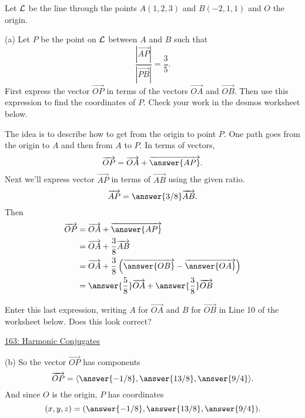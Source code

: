 \documentclass{ximera}
\begin{document}
\begin{question} \label{Q98344422}
Let ${\cal L}$ be the line through the points $A(1,2,3)$ and $B(-2,1,1)$ and $O$ the origin.

(a) Let $P$ be the point on ${\cal L}$ between $A$ and $B$ such that
\[
      \frac{|\overrightarrow{AP}|}{|\overrightarrow{PB}|} = \frac{3}{5} . 
\]
First express the vector $\overrightarrow{OP}$ in terms of the vectors $\overrightarrow{OA}$ and $\overrightarrow{OB}$. Then use this expression to find the coordinates of $P$. Check your work in the desmos worksheet below.

\begin{explanation}
The idea is to describe how to get from the origin to point $P$. One path goes from the origin to $A$ and then from $A$ to $P$. In terms of vectors,
\[
   \overrightarrow{OP} = \overrightarrow{OA} + \overrightarrow{\answer{AP}}.
\]
Next we'll express vector $\overrightarrow{AP}$ in terms of $\overrightarrow{AB}$ using the given ratio.
\[
      \overrightarrow{AP} = \answer{3/8} \overrightarrow{AB} .
\]
Then
\begin{align*}
  \overrightarrow{OP} &= \overrightarrow{OA} + \overrightarrow{\answer{AP}}  \\
                                &= \overrightarrow{OA} + \frac{3}{8} \overrightarrow{AB} \\
                                &= \overrightarrow{OA} + \frac{3}{8} \left( \overrightarrow{\answer{OB}} - \overrightarrow{\answer{OA}}   \right) \\
                                 &= \answer{\frac{5}{8}} \overrightarrow{OA} + \answer{\frac{3}{8}} \overrightarrow{OB}
\end{align*}

\begin{freeResponse}
Enter this last expression, writing $A$ for $\overrightarrow{OA}$ and $B$ for $\overrightarrow{OB}$ in Line 10 of the worksheet below. Does this look correct?
\end{freeResponse}

\begin{onlineOnly}
    \begin{center}
\end{center}
\end{onlineOnly}

\href{https://www.desmos.com/3d/kqq5ktp0jw}{163: Harmonic Conjugates}

(b) So the vector $\overrightarrow{OP}$ has components
\[
    \overrightarrow{OP} = \langle \answer{-1/8} , \answer{13/8} , \answer{9/4}   \rangle .
\]
And since $O$ is the origin, $P$ has coordinates
\[
   (x,y,z) = (\answer{-1/8} , \answer{13/8} , \answer{9/4}) .
\]


\end{explanation}
\end{question}
\end{document}
